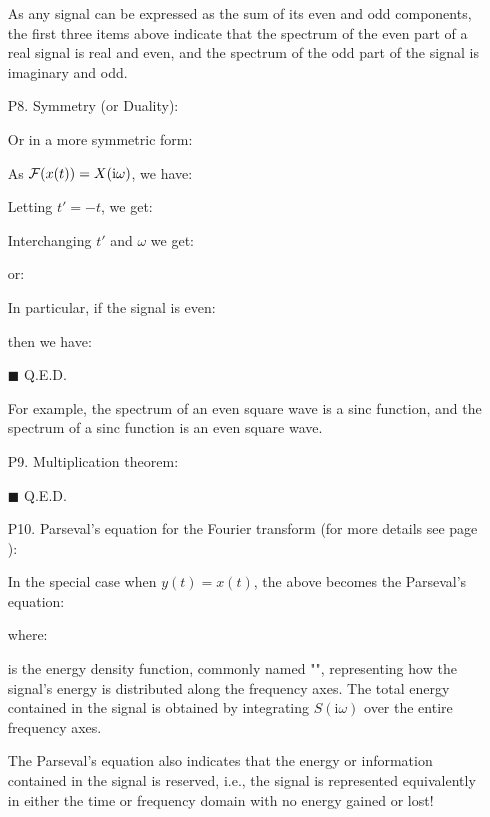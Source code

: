 \begin{itemize}
	As any signal can be expressed as the sum of its even and odd components, the first three items above indicate that the spectrum of the even part of a real signal is real and even, and the spectrum of the odd part of the signal is  imaginary and odd. 
	
	\item[P8.] Symmetry (or Duality):
	
	
	Or in a more symmetric form:
	
	\begin{dem} As ${\cal F}(x(t))=X(\mathrm{i}\omega)$, we have:
	
	Letting $t'=-t$, we get:
	
	Interchanging $t'$ and $\omega$ we get:
	
	or:
	
	In particular, if the signal is even:
	
	then we have:
	
	\begin{flushright}
		$\blacksquare$  Q.E.D.
	\end{flushright}
	\end{dem}
	For example, the spectrum of an even square wave is a sinc function, and the spectrum of a sinc function is an even square wave. 
	
	\item[P9.] Multiplication theorem:
	
	
	\begin{dem} 
	
	\begin{flushright}
		$\blacksquare$  Q.E.D.
	\end{flushright}
	\end{dem}
	
	\item[P10.] Parseval's equation for the Fourier transform (for more details see page \pageref{Parseval theorem}):
	
	In the special case when $y(t)=x(t)$, the above becomes the Parseval's equation:
	
	where:
	
	is the energy density function, commonly named "\label{power spectrum}", representing how the signal's energy is distributed along the frequency axes. The total energy contained in the signal is obtained by integrating $S(\mathrm{i}\omega)$ over the entire frequency axes.
	
	The Parseval's equation also indicates that the energy or information contained in the signal is reserved, i.e., the signal is represented equivalently in either the time or frequency domain with no energy gained or lost!
	

\end{itemize}
